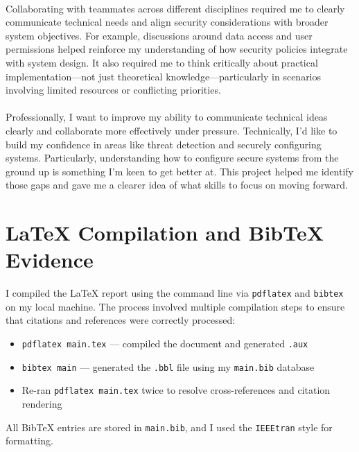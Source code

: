 \documentclass[a4paper, 11pt]{report}
\begin{document}
\paragraph{}
Collaborating with teammates across different disciplines required me to clearly communicate technical needs and align security considerations with broader system objectives. For example, discussions around data access and user permissions helped reinforce my understanding of how security policies integrate with system design. It also required me to think critically about practical implementation—not just theoretical knowledge—particularly in scenarios involving limited resources or conflicting priorities.

\paragraph{}
Professionally, I want to improve my ability to communicate technical ideas clearly and collaborate more effectively under pressure. Technically, I’d like to build my confidence in areas like threat detection and securely configuring systems. Particularly, understanding how to configure secure systems from the ground up is something I’m keen to get better at. This project helped me identify those gaps and gave me a clearer idea of what skills to focus on moving forward.

\section*{LaTeX Compilation and BibTeX Evidence}

I compiled the LaTeX report using the command line via \texttt{pdflatex} and \texttt{bibtex} on my local machine. The process involved multiple compilation steps to ensure that citations and references were correctly processed:

\begin{itemize}
  \item \texttt{pdflatex main.tex} --- compiled the document and generated \texttt{.aux}
  \item \texttt{bibtex main} --- generated the \texttt{.bbl} file using my \texttt{main.bib} database
  \item Re-ran \texttt{pdflatex main.tex} twice to resolve cross-references and citation rendering
\end{itemize}

All BibTeX entries are stored in \texttt{main.bib}, and I used the \texttt{IEEEtran} style for formatting. 
\end{document}
